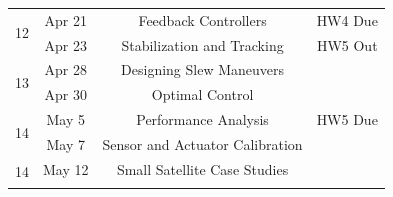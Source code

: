 \documentclass[11pt,letterpaper]{article}
\begin{document}
\begin{tabular}{c|c|c|c}
	 \hline
	\multirow{2}{*}{12}  & Apr 21 & Feedback Controllers
         &  HW4 Due \\
	 & Apr 23 & Stabilization and Tracking & HW5 Out  \\
	 \hline
	\multirow{2}{*}{13}  & Apr 28 & Designing Slew Maneuvers
         &  \\
	 & Apr 30 & Optimal Control &   \\
	 \hline
	\multirow{2}{*}{14}  & May 5 & Performance Analysis
         & HW5 Due \\
	 & May 7 & Sensor and Actuator Calibration &   \\
	 \hline
	\multirow{2}{*}{14}  & May 12 &
        Small Satellite Case Studies &  \\
	 &  &  &   \\
\end{tabular}
\end{document}
